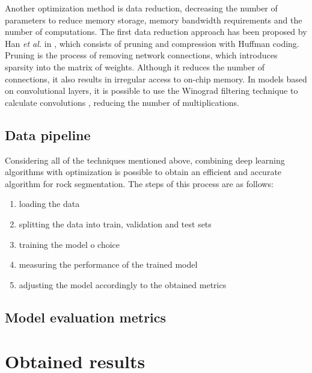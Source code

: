 \documentclass[a4paper,twoside,12pt]{book}
\begin{document}
Another optimization method is data reduction, decreasing the number of parameters to reduce memory storage, memory bandwidth requirements and the number of computations. The first data reduction approach has been proposed by Han \textit{et al.} in \cite{han2015deep}, which consists of pruning and compression with Huffman coding. Pruning is the process of removing network connections, which introduces sparsity into the matrix of weights. Although it reduces the number of connections, it also results in irregular access to on-chip memory. In models based on convolutional layers, it is possible to use the Winograd filtering technique \cite{winograd1980arithmetic} to calculate convolutions \cite{lavin2016fast}, reducing the number of multiplications.


\section{Data pipeline}
Considering all of the techniques mentioned above, combining deep learning algorithms with optimization is possible to obtain an efficient and accurate algorithm for rock segmentation. The steps of this process are as follows:
\begin{enumerate}
    \item loading the data
    \item splitting the data into train, validation and test sets
    \item training the model o choice
    \item measuring the performance of the trained model
    \item adjusting the model accordingly to the obtained metrics
\end{enumerate}

\section{Model evaluation metrics}

\chapter{Obtained results}
\label{sec:chapter3}
\end{document}
